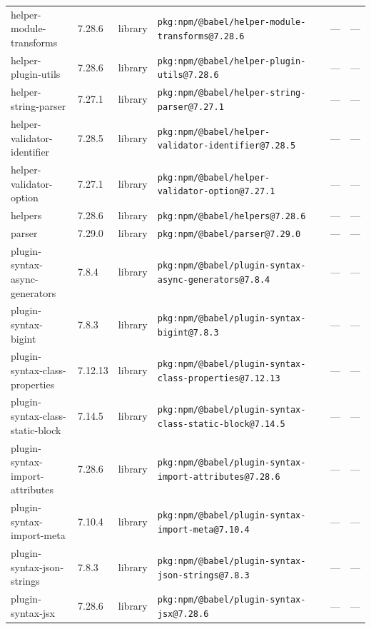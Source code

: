 \documentclass[11pt,a4paper]{article}
\begin{document}
\begin{longtable}{|p{4cm}|p{2cm}|p{1.6cm}|p{5cm}|p{1.5cm}|p{3.5cm}|}
\raggedright helper-module-transforms & 7.28.6 & library & \small\texttt{pkg:npm/@babel/helper-module-transforms@7.28.6} & — & \small — \\
\raggedright helper-plugin-utils & 7.28.6 & library & \small\texttt{pkg:npm/@babel/helper-plugin-utils@7.28.6} & — & \small — \\
\raggedright helper-string-parser & 7.27.1 & library & \small\texttt{pkg:npm/@babel/helper-string-parser@7.27.1} & — & \small — \\
\raggedright helper-validator-identifier & 7.28.5 & library & \small\texttt{pkg:npm/@babel/helper-validator-identifier@7.28.5} & — & \small — \\
\raggedright helper-validator-option & 7.27.1 & library & \small\texttt{pkg:npm/@babel/helper-validator-option@7.27.1} & — & \small — \\
\raggedright helpers & 7.28.6 & library & \small\texttt{pkg:npm/@babel/helpers@7.28.6} & — & \small — \\
\raggedright parser & 7.29.0 & library & \small\texttt{pkg:npm/@babel/parser@7.29.0} & — & \small — \\
\raggedright plugin-syntax-async-generators & 7.8.4 & library & \small\texttt{pkg:npm/@babel/plugin-syntax-async-generators@7.8.4} & — & \small — \\
\raggedright plugin-syntax-bigint & 7.8.3 & library & \small\texttt{pkg:npm/@babel/plugin-syntax-bigint@7.8.3} & — & \small — \\
\raggedright plugin-syntax-class-properties & 7.12.13 & library & \small\texttt{pkg:npm/@babel/plugin-syntax-class-properties@7.12.13} & — & \small — \\
\raggedright plugin-syntax-class-static-block & 7.14.5 & library & \small\texttt{pkg:npm/@babel/plugin-syntax-class-static-block@7.14.5} & — & \small — \\
\raggedright plugin-syntax-import-attributes & 7.28.6 & library & \small\texttt{pkg:npm/@babel/plugin-syntax-import-attributes@7.28.6} & — & \small — \\
\raggedright plugin-syntax-import-meta & 7.10.4 & library & \small\texttt{pkg:npm/@babel/plugin-syntax-import-meta@7.10.4} & — & \small — \\
\raggedright plugin-syntax-json-strings & 7.8.3 & library & \small\texttt{pkg:npm/@babel/plugin-syntax-json-strings@7.8.3} & — & \small — \\
\raggedright plugin-syntax-jsx & 7.28.6 & library & \small\texttt{pkg:npm/@babel/plugin-syntax-jsx@7.28.6} & — & \small — \\

\end{longtable}
\end{document}
